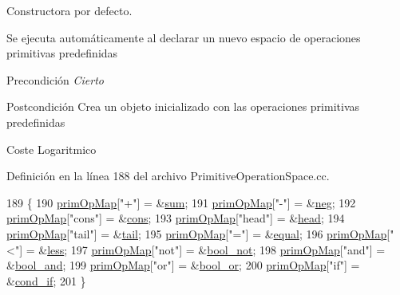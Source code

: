 Constructora por defecto. 

Se ejecuta automáticamente al declarar un nuevo espacio de operaciones primitivas predefinidas \begin{DoxyPrecond}{Precondición}
{\itshape Cierto} 
\end{DoxyPrecond}
\begin{DoxyPostcond}{Postcondición}
Crea un objeto inicializado con las operaciones primitivas predefinidas 
\end{DoxyPostcond}
\begin{DoxyParagraph}{Coste}
Logaritmico 
\end{DoxyParagraph}


Definición en la línea 188 del archivo Primitive\+Operation\+Space.\+cc.


\begin{DoxyCode}
189 \{
190   \hyperlink{class_primitive_operation_space_afd359615001ed1e9b44b9618287834ec}{primOpMap}[\textcolor{stringliteral}{"+"}] = &\hyperlink{class_primitive_operation_space_aa30a58f2003a097535af96ea40b03429}{sum};
191   \hyperlink{class_primitive_operation_space_afd359615001ed1e9b44b9618287834ec}{primOpMap}[\textcolor{stringliteral}{"-"}] = &\hyperlink{class_primitive_operation_space_a2ac4306bae8330f3eb73f5ef8926dfda}{neg};
192   \hyperlink{class_primitive_operation_space_afd359615001ed1e9b44b9618287834ec}{primOpMap}[\textcolor{stringliteral}{"cons"}] = &\hyperlink{class_primitive_operation_space_a4d80dbbbc29a79c286df7c8d7f351111}{cons};
193   \hyperlink{class_primitive_operation_space_afd359615001ed1e9b44b9618287834ec}{primOpMap}[\textcolor{stringliteral}{"head"}] = &\hyperlink{class_primitive_operation_space_a97c2b5092e2465c7deb1aff6ceccc7de}{head};
194   \hyperlink{class_primitive_operation_space_afd359615001ed1e9b44b9618287834ec}{primOpMap}[\textcolor{stringliteral}{"tail"}] = &\hyperlink{class_primitive_operation_space_a08ecc4d0207c93ab245f05732e0024c3}{tail};
195   \hyperlink{class_primitive_operation_space_afd359615001ed1e9b44b9618287834ec}{primOpMap}[\textcolor{stringliteral}{"="}] = &\hyperlink{class_primitive_operation_space_a0a18ec45c82366aea7d1a39ec3b6bb57}{equal};
196   \hyperlink{class_primitive_operation_space_afd359615001ed1e9b44b9618287834ec}{primOpMap}[\textcolor{stringliteral}{"<"}] = &\hyperlink{class_primitive_operation_space_aa5b70cdd115a646d48f686fd49cdedb1}{less};
197   \hyperlink{class_primitive_operation_space_afd359615001ed1e9b44b9618287834ec}{primOpMap}[\textcolor{stringliteral}{"not"}] = &\hyperlink{class_primitive_operation_space_afcb171950067a1a6638b01c916900c78}{bool\_not};
198   \hyperlink{class_primitive_operation_space_afd359615001ed1e9b44b9618287834ec}{primOpMap}[\textcolor{stringliteral}{"and"}] = &\hyperlink{class_primitive_operation_space_a741c40c2ced4d13a87b4ee5c849abdfd}{bool\_and};
199   \hyperlink{class_primitive_operation_space_afd359615001ed1e9b44b9618287834ec}{primOpMap}[\textcolor{stringliteral}{"or"}] = &\hyperlink{class_primitive_operation_space_abb131ec0899228bc3fe2ed54d5c0ebc9}{bool\_or};
200   \hyperlink{class_primitive_operation_space_afd359615001ed1e9b44b9618287834ec}{primOpMap}[\textcolor{stringliteral}{"if"}] = &\hyperlink{class_primitive_operation_space_abbb7fc1afddfa5c5041ac8adfa4a2d55}{cond\_if};
201 \}
\end{DoxyCode}
